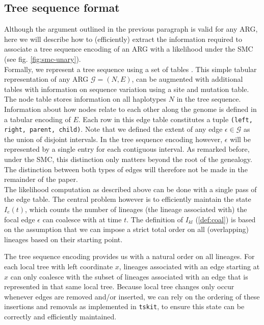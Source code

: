 \documentclass{article}
\begin{document}
\subsection{Tree sequence format} \label{par:algo}

Although the argument outlined in the previous paragraph is valid for any ARG, here we 
will describe how to (efficiently) extract the information required to associate a
tree sequence encoding of an ARG with a likelihood under the SMC (see fig. \ref{fig:smc-unary}).\\

Formally, we represent a tree sequence using a set of tables \citep{kelleher_efficient_2018}. 
This simple tabular representation of any ARG $\mathcal{G} = (N, E)$, can be 
augmented with additional tables with information on sequence variation
using a site and mutation table. The node table stores information on all 
haplotypes $N$ in the tree sequence. Information about how nodes relate to 
each other along the genome is defined in a tabular encoding of $E$.
Each row in this edge table constitutes a tuple \texttt{(left, right, parent, child)}.
Note that we defined the extent of any edge $\epsilon \in \mathcal{G}$ as the union of 
disjoint intervals. In the tree sequence encoding however, $\epsilon$ will be represented 
by a single entry for each contiguous interval. As remarked before, under the SMC, this 
distinction only matters beyond the root of the genealogy. The distinction between both 
types of edges will therefore not be made in the remainder of the paper.
\\

The likelihood computation as described above can be done with a single pass 
of the edge table.
The central problem however is to efficiently maintain the state $I_e(t)$, which counts 
the number of lineages (the lineage associated with) the focal edge $\epsilon$ can coalesce 
with at time $t$. 
The definition of $I_{kl}$ (\ref{def:coal}) is based on the assumption 
that we can impose a strict total order on all (overlapping) lineages based on their 
starting point.

The tree sequence encoding provides us with a natural order on all lineages.  
For each local tree with left coordinate $x$, lineages associated with an edge 
starting at $x$ can only coalesce with the subset of lineages associated with an 
edge that is represented in that same local tree. Because local tree changes 
only occur whenever edges are removed and/or inserted,
we can rely on the ordering of these insertions and removals as implemented in
\texttt{tskit}, to ensure this state can be correctly and efficiently maintained.\\
\end{document}
